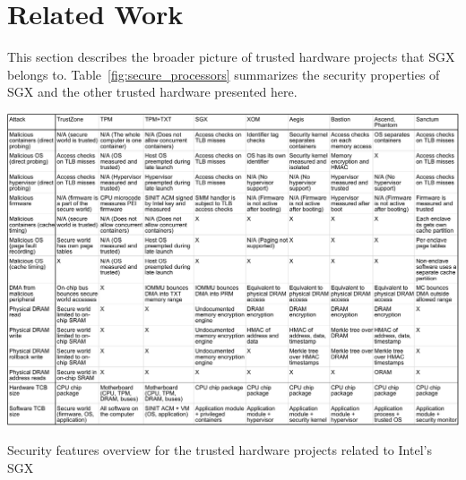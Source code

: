 \section{Related Work}
\label{sec:related}

This section describes the broader picture of trusted hardware projects that
SGX belongs to. Table~\ref{fig:secure_processors} summarizes the security
properties of SGX and the other trusted hardware presented here.

\begin{table}
  \centering
  \includegraphics[angle=90,width=170mm]{figures/secure_processors_table.pdf}
  \caption{
    Security features overview for the trusted hardware projects related to
    Intel's SGX
  }
  \label{fig:secure_processors}
\end{table}












